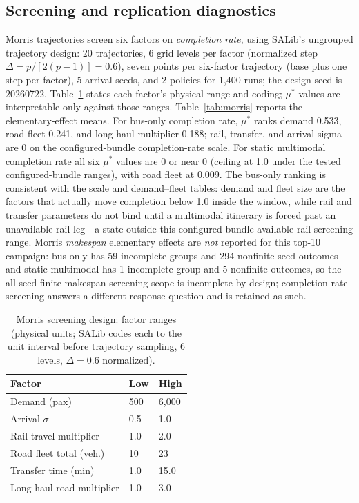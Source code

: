 \documentclass{ieeeaccess}
\begin{document}
\subsection{Screening and replication diagnostics}
Morris trajectories screen six factors on \emph{completion rate}, using SALib's ungrouped trajectory design: 20 trajectories, 6 grid levels per factor (normalized step $\Delta=p/[2(p-1)]=0.6$), seven points per six-factor trajectory (base plus one step per factor), 5 arrival seeds, and 2 policies for 1{,}400 runs; the design seed is 20260722. Table~\ref{tab:morrisdesign} states each factor's physical range and coding; $\mu^{*}$ values are interpretable only against those ranges. Table~\ref{tab:morris} reports the elementary-effect means. For bus-only completion rate, $\mu^{*}$ ranks demand 0.533, road fleet 0.241, and long-haul multiplier 0.188; rail, transfer, and arrival sigma are 0 on the configured-bundle completion-rate scale. For static multimodal completion rate all six $\mu^{*}$ values are 0 or near 0 (ceiling at 1.0 under the tested configured-bundle ranges), with road fleet at 0.009. The bus-only ranking is consistent with the scale and demand--fleet tables: demand and fleet size are the factors that actually move completion below 1.0 inside the window, while rail and transfer parameters do not bind until a multimodal itinerary is forced past an unavailable rail leg---a state outside this configured-bundle available-rail screening range. Morris \emph{makespan} elementary effects are \emph{not} reported for this top-10 campaign: bus-only has 59 incomplete groups and 294 nonfinite seed outcomes and static multimodal has 1 incomplete group and 5 nonfinite outcomes, so the all-seed finite-makespan screening scope is incomplete by design; completion-rate screening answers a different response question and is retained as such.

\begin{table}[!t]
\caption{Morris screening design: factor ranges (physical units; SALib codes each to the unit interval before trajectory sampling, 6 levels, $\Delta=0.6$ normalized).}
\label{tab:morrisdesign}
\centering
\footnotesize
\begin{tabular}{@{}lll@{}}
\hline
Factor & Low & High \\
\hline
Demand (pax) & 500 & 6{,}000 \\
Arrival $\sigma$ & 0.5 & 1.0 \\
Rail travel multiplier & 1.0 & 2.0 \\
Road fleet total (veh.) & 10 & 23 \\
Transfer time (min) & 1.0 & 15.0 \\
Long-haul road multiplier & 1.0 & 3.0 \\
\hline
\end{tabular}
\end{table}
\end{document}
